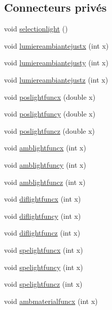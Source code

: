 \subsection*{Connecteurs privés}
\begin{DoxyCompactItemize}
\item 
void \hyperlink{class_mondock_a25391f1fac7a8a46e761f2f8c9c2fdc8}{selectionlight} ()
\item 
void \hyperlink{class_mondock_a1cdbe11296a3fe24d88992bf7d2236f4}{lumiereambiantejustx} (int x)
\item 
void \hyperlink{class_mondock_ae989829f726237ddcacbe9b1ae79ab62}{lumiereambiantejusty} (int x)
\item 
void \hyperlink{class_mondock_a824b5c728f21b3ef7d47d322cd0a07ee}{lumiereambiantejustz} (int x)
\item 
void \hyperlink{class_mondock_a05ec25870c70f2eeba2ccdc1da44e7ca}{poslightfuncx} (double x)
\item 
void \hyperlink{class_mondock_ae8593b3cbc4c42badf600599a2e01dce}{poslightfuncy} (double x)
\item 
void \hyperlink{class_mondock_aa5ec8a8453515216ffd85961c868108f}{poslightfuncz} (double x)
\item 
void \hyperlink{class_mondock_a07685bc7db5c3346c1813e84abf8aa2f}{amblightfuncx} (int x)
\item 
void \hyperlink{class_mondock_a2397e94ee9af0a37c12b1443d70c17b6}{amblightfuncy} (int x)
\item 
void \hyperlink{class_mondock_a727e012b9b0df615ea2d585f98b00fb9}{amblightfuncz} (int x)
\item 
void \hyperlink{class_mondock_ad475a793b9d77352f2e844b22315612e}{diflightfuncx} (int x)
\item 
void \hyperlink{class_mondock_a5e60c8e141570f171d420de6f6e9af54}{diflightfuncy} (int x)
\item 
void \hyperlink{class_mondock_a4fd34f4035885b71a4d914ff85496715}{diflightfuncz} (int x)
\item 
void \hyperlink{class_mondock_ad12c449ba7b08f8430353e5fb7687e6a}{spelightfuncx} (int x)
\item 
void \hyperlink{class_mondock_ac2c735aede2c4c621f08f9c34d6a4c9c}{spelightfuncy} (int x)
\item 
void \hyperlink{class_mondock_ad626e2142ce5065af9a3bd891c825a5a}{spelightfuncz} (int x)
\item 
void \hyperlink{class_mondock_a8311bcb6b47314eba3966861c6cfe53a}{ambmaterialfuncx} (int x)
\item 

\end{DoxyCompactItemize}
